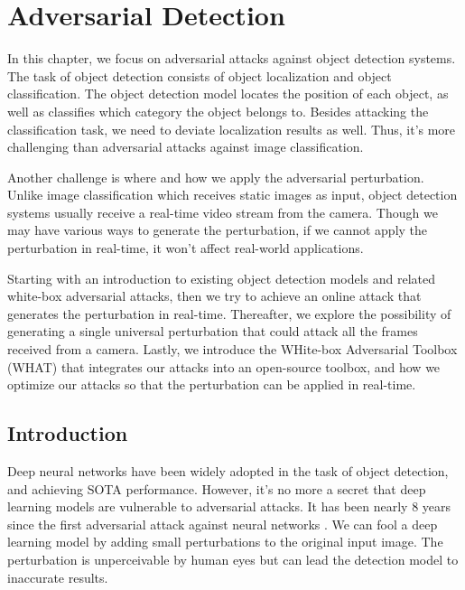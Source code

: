 \chapter{Adversarial Detection}
\label{chpt:detection}


In this chapter, we focus on adversarial attacks against object detection systems. The task of object detection consists of object localization and object classification. The object detection model locates the position of each object, as well as classifies which category the object belongs to. Besides attacking the classification task, we need to deviate localization results as well. Thus, it's more challenging than adversarial attacks against image classification.

Another challenge is where and how we apply the adversarial perturbation. Unlike image classification which receives static images as input, object detection systems usually receive a real-time video stream from the camera. Though we may have various ways to generate the perturbation, if we cannot apply the perturbation in real-time, it won't affect real-world applications.

Starting with an introduction to existing object detection models and related white-box adversarial attacks, then we try to achieve an online attack that generates the perturbation in real-time. Thereafter, we explore the possibility of generating a single universal perturbation that could attack all the frames received from a camera. Lastly, we introduce the WHite-box Adversarial Toolbox (WHAT) that integrates our attacks into an open-source toolbox, and how we optimize our attacks so that the perturbation can be applied in real-time.

\section{Introduction}

Deep neural networks have been widely adopted in the task of object detection, and achieving SOTA performance. However, it's no more a secret that deep learning models are vulnerable to adversarial attacks. It has been nearly 8 years since the first adversarial attack against neural networks \citep{goodfellow2015explaining}. We can fool a deep learning model by adding small perturbations to the original input image. The perturbation is unperceivable by human eyes but can lead the detection model to inaccurate results.

